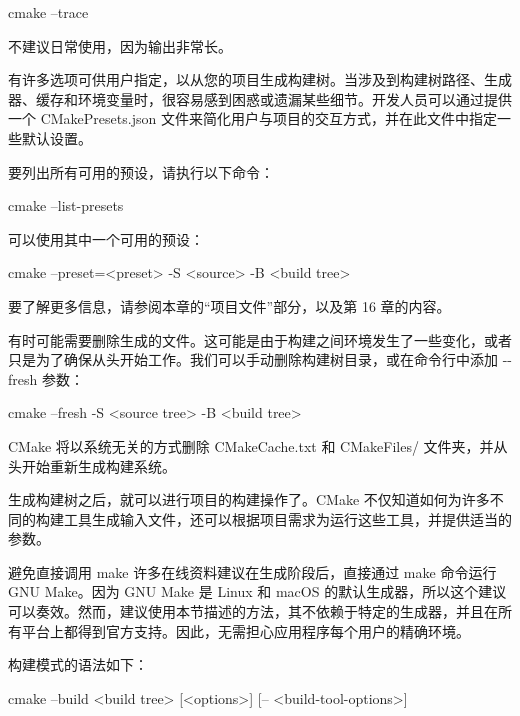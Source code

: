 \begin{shell}
cmake --trace
\end{shell}

不建议日常使用，因为输出非常长。


有许多选项可供用户指定，以从您的项目生成构建树。当涉及到构建树路径、生成器、缓存和环境变量时，很容易感到困惑或遗漏某些细节。开发人员可以通过提供一个 CMakePresets.json 文件来简化用户与项目的交互方式，并在此文件中指定一些默认设置。

要列出所有可用的预设，请执行以下命令：

\begin{shell}
cmake --list-presets
\end{shell}

可以使用其中一个可用的预设：

\begin{shell}
cmake --preset=<preset> -S <source> -B <build tree>
\end{shell}

要了解更多信息，请参阅本章的“项目文件”部分，以及第 16 章的内容。


有时可能需要删除生成的文件。这可能是由于构建之间环境发生了一些变化，或者只是为了确保从头开始工作。我们可以手动删除构建树目录，或在命令行中添加 -{}-fresh 参数：

\begin{shell}
cmake --fresh -S <source tree> -B <build tree>
\end{shell}

CMake 将以系统无关的方式删除 CMakeCache.txt 和 CMakeFiles/ 文件夹，并从头开始重新生成构建系统。


生成构建树之后，就可以进行项目的构建操作了。CMake 不仅知道如何为许多不同的构建工具生成输入文件，还可以根据项目需求为运行这些工具，并提供适当的参数。

\begin{myNotic}{避免直接调用 make}
许多在线资料建议在生成阶段后，直接通过 make 命令运行 GNU Make。因为 GNU Make 是 Linux 和 macOS 的默认生成器，所以这个建议可以奏效。然而，建议使用本节描述的方法，其不依赖于特定的生成器，并且在所有平台上都得到官方支持。因此，无需担心应用程序每个用户的精确环境。
\end{myNotic}

构建模式的语法如下：

\begin{shell}
cmake --build <build tree> [<options>] [-- <build-tool-options>]
\end{shell}

